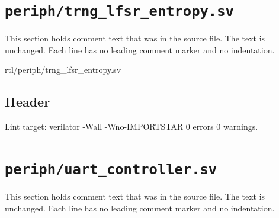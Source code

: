 \section{\texttt{periph/trng\_lfsr\_entropy.sv}}\label{tm:mod:trng-lfsr-entropy}

This section holds comment text that was in the source file. The text is unchanged. Each line has no leading comment marker and no indentation.

\begin{relocated}{rtl/periph/trng_lfsr_entropy.sv}

\subsection*{Header}

\begin{textblock}
Lint target: verilator -Wall -Wno-IMPORTSTAR 0 errors 0 warnings.
\end{textblock}

\end{relocated}

\section{\texttt{periph/uart\_controller.sv}}\label{tm:mod:uart-controller}

This section holds comment text that was in the source file. The text is unchanged. Each line has no leading comment marker and no indentation.

